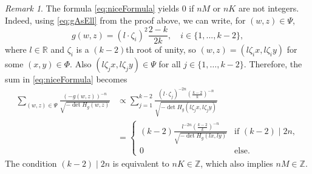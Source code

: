 \documentclass[english]{ourlematemasingle}
\numberwithin{theorem}{section}
\theoremstyle{remark}
\newtheorem{remark}[theorem]{Remark}
\newcommand{\R}{\mathbb{R}}
\newcommand{\Z}{\mathbb{Z}}
\begin{document}
\begin{remark}
    The formula \eqref{eq:niceFormula} yields $0$ if $nM$ or $nK$ are not integers. Indeed, using \eqref{eq:gAsEll} from the proof above, we can write, for $(w,z)\in\Psi$, 
    \[
    g(w,z) = (l\cdot \zeta_i)^2 \frac{2-k}{2k}, \quad i\in\{1,...,k-2\},
    \]
    where $l\in\R$ and $\zeta_i$ is a $(k-2)$th root of unity, so $(w,z) = (l\zeta_ix,l\zeta_iy)$ for some $(x,y)\in\Phi$. Also $(l\zeta_jx,l\zeta_jy)\in\Psi$ for all $j\in\{1,\dots,k-2\}$. Therefore, the sum in \eqref{eq:niceFormula} becomes
    \begin{align*}
        \sum\limits_{(w,z) \in \Psi} \frac{(-g(w,z))^{-n}}{\sqrt{-\det H_g(w,z)}}
        & \propto 
        \sum_{j=1}^{k-2} \frac{\left( l\cdot\zeta_j \right)^{-2n} \left( \frac{k-2}{k}\right)^{-n} }{\sqrt{-\det H_g(l\zeta_j x, l\zeta_j y)}}\\
        & = \left\{ \begin{array}{ll}
            (k-2) \frac{l^{-2n} \left( \frac{k-2}{k}\right)^{-n}}{\sqrt{-\det H_g(l x, l y)}}& \text{if } (k-2)\mid 2n, \\
            0 & \text{else.}
        \end{array}\right.
    \end{align*}
    The condition $(k-2)\mid 2n$ is equivalent to $nK\in\Z$, which also implies $nM\in\Z$.
\end{remark}
\end{document}
